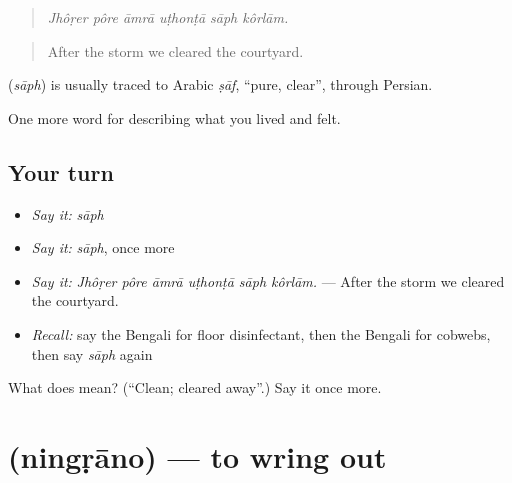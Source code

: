 \begin{quote}
     
\end{quote}

\begin{quote}
\emph{Jhôṛer pôre āmrā uṭhonṭā sāph kôrlām.}
\end{quote}

\begin{quote}
After the storm we cleared the courtyard.
\end{quote}

\begin{cousinweb}
\textbf{} (\emph{sāph}) is usually traced to Arabic \emph{ṣāf}, \textquotedblleft{}pure, clear\textquotedblright{}, through Persian.
\end{cousinweb}

\begin{grammarlens}[title={What you've built}]
One more word for describing what you lived and felt.
\end{grammarlens}

\subsection*{Your turn}
\begin{itemize}
\raggedright
  \item \emph{Say it:} \emph{sāph}
  \item \emph{Say it:} \emph{sāph}, once more
  \item \emph{Say it:} \emph{Jhôṛer pôre āmrā uṭhonṭā sāph kôrlām.} — After the storm we cleared the courtyard.
  \item \emph{Recall:} say the Bengali for floor disinfectant, then the Bengali for cobwebs, then say \emph{sāph} again
\end{itemize}

\begin{tcolorbox}[breakable,colback=teal!4,colframe=teal!35!black,title={Before you move on}]
What does  mean? (\textquotedblleft{}Clean; cleared away\textquotedblright{}.) Say it once more.
\end{tcolorbox}
\section[\texorpdfstring{\bn{নিংড়ানো} (ningṛāno)}{নিংড়ানো (ningṛāno)}]{ (ningṛāno) — to wring out}

\label{lesson:BN-C510-ningrano}



